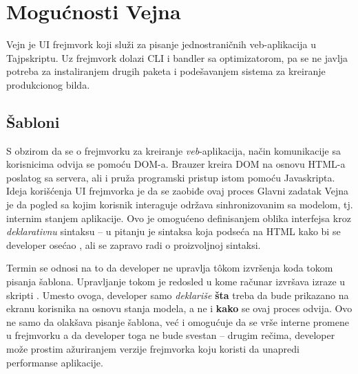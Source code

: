 \chapter{Mogućnosti Vejna}

Vejn je UI frejmvork koji služi za pisanje jednostraničnih veb-aplikacija u Tajpskriptu.
Uz frejmvork dolazi CLI i bandler sa optimizatorom, pa se ne javlja potreba za instaliranjem drugih paketa i podešavanjem sistema za kreiranje produkcionog bilda.

\section{Šabloni}





S obzirom da se o frejmvorku za kreiranje \emph{veb}-aplikacija, način komunikacije sa korisnicima odvija se pomoću DOM-a.
Brauzer kreira DOM na osnovu HTML-a poslatog sa servera, ali i pruža programski pristup istom pomoću Javaskripta.
Ideja korišćenja UI frejmvorka je da se zaobiđe ovaj proces
Glavni zadatak Vejna je da pogled sa kojim korisnik interaguje održava sinhronizovanim sa modelom, tj. internim stanjem aplikacije.
Ovo je omogućeno definisanjem oblika interfejsa kroz \emph{deklarativnu} sintaksu -- u pitanju je sintaksa koja podseća na HTML kako bi se developer osećao , ali se zapravo radi o proizvoljnoj sintaksi.

Termin  se odnosi na to da developer ne upravlja t\^okom izvršenja koda tokom pisanja šablona.
Upravljanje tokom je redosled u kome računar izvršava izraze u skripti \cite{mdn:glossary:control-flow}.
Umesto ovoga, developer samo \emph{deklariše} \textbf{šta} treba da bude prikazano na ekranu korisnika na osnovu stanja modela, a ne i \textbf{kako} se ovaj proces odvija.
Ovo ne samo da olakšava pisanje šablona, već i omogućuje da se vrše interne promene u frejmvorku a da developer toga ne bude svestan -- drugim rečima, developer može prostim ažuriranjem verzije frejmvorka koju koristi da unapredi performanse aplikacije.

